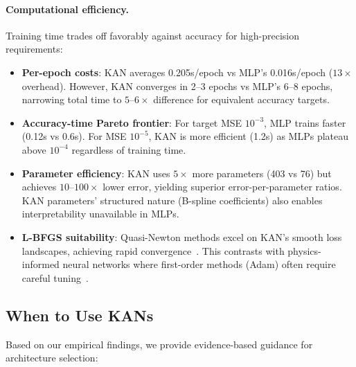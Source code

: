 \documentclass[11pt,a4paper]{article}
\begin{document}
\paragraph{Computational efficiency.} Training time trades off favorably against accuracy for high-precision requirements:
\begin{itemize}
    \item \textbf{Per-epoch costs}: KAN averages 0.205s/epoch vs MLP's 0.016s/epoch ($13\times$ overhead). However, KAN converges in 2--3 epochs vs MLP's 6--8 epochs, narrowing total time to $5$--$6\times$ difference for equivalent accuracy targets.
    \item \textbf{Accuracy-time Pareto frontier}: For target MSE $10^{-3}$, MLP trains faster (0.12s vs 0.6s). For MSE $10^{-5}$, KAN is more efficient (1.2s) as MLPs plateau above $10^{-4}$ regardless of training time.
    \item \textbf{Parameter efficiency}: KAN uses $5\times$ more parameters (403 vs 76) but achieves $10$--$100\times$ lower error, yielding superior error-per-parameter ratios. KAN parameters' structured nature (B-spline coefficients) also enables interpretability unavailable in MLPs.
    \item \textbf{L-BFGS suitability}: Quasi-Newton methods excel on KAN's smooth loss landscapes, achieving rapid convergence~\citep{liu1989limited}. This contrasts with physics-informed neural networks where first-order methods (Adam) often require careful tuning~\citep{krishnapriyan2021characterizing, kingma2015adam}.
\end{itemize}

\subsection{When to Use KANs}

Based on our empirical findings, we provide evidence-based guidance for architecture selection:
\end{document}
